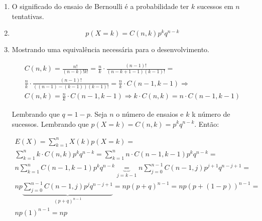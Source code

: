 \item
	\begin{enumerate}
		\item
		O significado do ensaio de Bernoulli é a probabilidade ter
		$k$ sucessos em $n$ tentativas.

		\item
		\[p(X=k)=C(n,k)p^kq^{n-k}\]

		\item
		Mostrando uma equivalência necessária para o desenvolvimento.

		\[\begin{array}{l}
		C(n,k) = \frac{{n!}}{{(n - k)!k!}} = \frac{n}{k} \cdot \frac{{(n - 1)!}}{{(n - k + 1 - 1)(k - 1)!}} = \\
		\frac{n}{k} \cdot \frac{{(n - 1)!}}{{((n - 1) - (k - 1))(k - 1)!}} = \frac{n}{k} \cdot C(n - 1,k - 1) \Rightarrow \\
		C(n,k) = \frac{n}{k} \cdot C(n - 1,k - 1) \Rightarrow k \cdot C(n,k) = n \cdot C(n - 1,k - 1)
		\end{array}\]

		Lembrando que $q = 1 - p$. Seja $n$ o número de ensaios e $k$ k número de sucessos.
		Lembrando que $p(X=k)=C(n,k)=p^kq^{n-k}$. Então:

		\[\begin{array}{l}
		E(X) = \sum\limits_{k = 1}^n {X(k)p(X = k)}  = \\
		\sum\limits_{k = 1}^n {k \cdot C(n,k){p^k}{q^{n - k}}}  = \sum\limits_{k = 1}^n {n \cdot C(n - 1,k - 1){p^k}{q^{n - k}}}  = \\
		n\sum\limits_{k = 1}^n {C(n - 1,k - 1){p^k}{q^{n - k}}} \underbrace  = _{j = k - 1}n\sum\limits_{j = 0}^{n - 1} {C(n - 1,j){p^{j + 1}}{q^{n - j + 1}}}  = \\
		np\underbrace {\sum\limits_{j = 0}^{n - 1} {C(n - 1,j){p^j}{q^{n - j + 1}}} }_{{{(p + q)}^{n - 1}}} = np{(p + q)^{n - 1}} = np{(p + (1 - p))^{n - 1}} = \\
		np{(1)^{n - 1}} = np
		\end{array}\]
	\end{enumerate}
